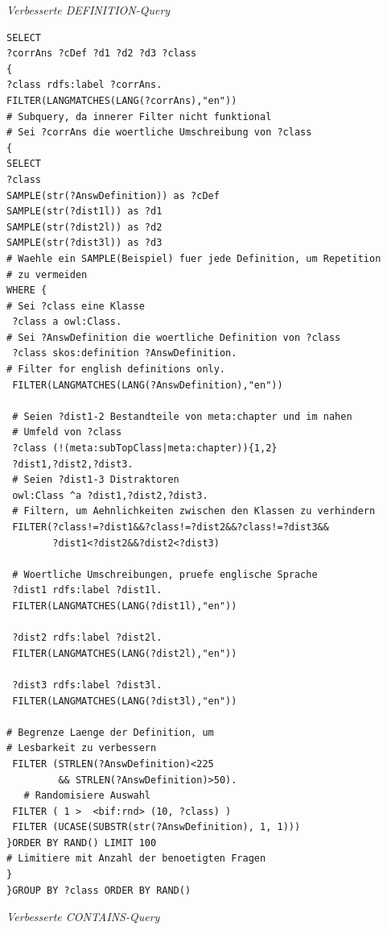\documentclass[headsepline,titlepage,ngerman,twoside,12pt]{report}
\begin{document}
\textit{Verbesserte DEFINITION-Query}
\begin{lstlisting}[basicstyle=\tiny]
SELECT
?corrAns ?cDef ?d1 ?d2 ?d3 ?class
{
?class rdfs:label ?corrAns.
FILTER(LANGMATCHES(LANG(?corrAns),"en"))
# Subquery, da innerer Filter nicht funktional
# Sei ?corrAns die woertliche Umschreibung von ?class
{
SELECT
?class
SAMPLE(str(?AnswDefinition)) as ?cDef
SAMPLE(str(?dist1l)) as ?d1
SAMPLE(str(?dist2l)) as ?d2
SAMPLE(str(?dist3l)) as ?d3
# Waehle ein SAMPLE(Beispiel) fuer jede Definition, um Repetition
# zu vermeiden
WHERE {
# Sei ?class eine Klasse
 ?class a owl:Class.
# Sei ?AnswDefinition die woertliche Definition von ?class
 ?class skos:definition ?AnswDefinition.
# Filter for english definitions only.
 FILTER(LANGMATCHES(LANG(?AnswDefinition),"en"))

 # Seien ?dist1-2 Bestandteile von meta:chapter und im nahen
 # Umfeld von ?class
 ?class (!(meta:subTopClass|meta:chapter)){1,2} 
 ?dist1,?dist2,?dist3.
 # Seien ?dist1-3 Distraktoren
 owl:Class ^a ?dist1,?dist2,?dist3.
 # Filtern, um Aehnlichkeiten zwischen den Klassen zu verhindern
 FILTER(?class!=?dist1&&?class!=?dist2&&?class!=?dist3&&
        ?dist1<?dist2&&?dist2<?dist3)

 # Woertliche Umschreibungen, pruefe englische Sprache
 ?dist1 rdfs:label ?dist1l.
 FILTER(LANGMATCHES(LANG(?dist1l),"en"))

 ?dist2 rdfs:label ?dist2l.
 FILTER(LANGMATCHES(LANG(?dist2l),"en"))

 ?dist3 rdfs:label ?dist3l.
 FILTER(LANGMATCHES(LANG(?dist3l),"en"))

# Begrenze Laenge der Definition, um
# Lesbarkeit zu verbessern
 FILTER (STRLEN(?AnswDefinition)<225 
         && STRLEN(?AnswDefinition)>50).
   # Randomisiere Auswahl
 FILTER ( 1 >  <bif:rnd> (10, ?class) )
 FILTER (UCASE(SUBSTR(str(?AnswDefinition), 1, 1)))
}ORDER BY RAND() LIMIT 100
# Limitiere mit Anzahl der benoetigten Fragen
}
}GROUP BY ?class ORDER BY RAND()

\end{lstlisting}

\textit{Verbesserte CONTAINS-Query}
\end{document}

